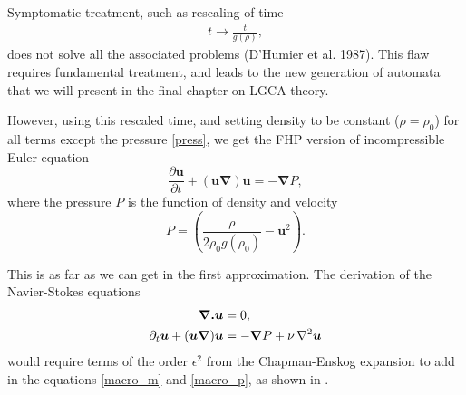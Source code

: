 Symptomatic treatment, such as rescaling of time
\begin{align} \label{frac_resc}
t \rightarrow \frac{t}{g(\rho)},
\end{align}
does not solve all the associated problems (D'Humier et al. 1987).
This flaw requires fundamental treatment, and leads to the new generation of automata that we will present in the final chapter on LGCA theory.

However, using this rescaled time, and setting density to be constant ($\rho = \rho_0$) for all terms except the pressure \ref{press}, we get the FHP version of incompressible Euler equation
\begin{equation}
\frac{\partial \bm{u}}{\partial t} + (\bm{u} \bm{\nabla}) \bm{u} = -\bm{\nabla} P,
\end{equation}
where the pressure $P$ is the function of density and velocity
\begin{equation} \label{press}
P = (\frac{\rho}{2\rho_0 g(\rho_0)} - \bm{u}^2).
\end{equation}

This is as far as we can get in the first approximation.
The derivation of the Navier-Stokes equations
\begin{align}
\begin{split}
\bm{\nabla . u} &= 0, \\
\partial_t \bm{u} + (\bm{u \nabla})\bm{u} &= - \bm{\nabla} P + \nu \, \nabla^2 \bm{u}
\end{split}
\end{align}
would require terms of the order $\epsilon^2$  from the Chapman-Enskog expansion to add in the equations \ref{macro_m} and \ref{macro_p}, as shown in \cite{frisch}.

%

 
% 
%
%

